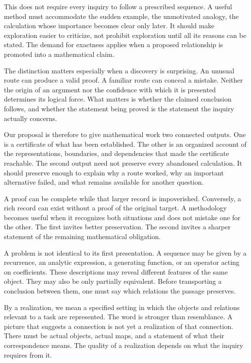 This does not require every inquiry to follow a prescribed sequence. A useful method must accommodate the sudden example, the unmotivated analogy, the calculation whose importance becomes clear only later. It should make exploration easier to criticize, not prohibit exploration until all its reasons can be stated. The demand for exactness applies when a proposed relationship is promoted into a mathematical claim.

The distinction matters especially when a discovery is surprising. An unusual route can produce a valid proof. A familiar route can conceal a mistake. Neither the origin of an argument nor the confidence with which it is presented determines its logical force. What matters is whether the claimed conclusion follows, and whether the statement being proved is the statement the inquiry actually concerns.

Our proposal is therefore to give mathematical work two connected outputs. One is a certificate of what has been established. The other is an organized account of the representations, boundaries, and dependencies that made the certificate reachable. The second output need not preserve every abandoned calculation. It should preserve enough to explain why a route worked, why an important alternative failed, and what remains available for another question.

A proof can be complete while that larger record is impoverished. Conversely, a rich record can exist without a proof of the original target. A methodology becomes useful when it recognizes both situations and does not mistake one for the other. The first invites better preservation. The second invites a sharper statement of the remaining mathematical obligation.


A problem is not identical to its first presentation. A sequence may be given by a recurrence, an analytic expression, a generating function, or an operator acting on coefficients. These descriptions may reveal different features of the same object. They may also be only partially equivalent. Before transporting a conclusion between them, one must say which relations the passage preserves.

By a realization, we mean a specified setting in which the objects and relations relevant to a task are represented. The word is stronger than resemblance. A picture that suggests a connection is not yet a realization of that connection. There must be actual objects, actual maps, and a statement of what their correspondence means. The quality of a realization depends on what the inquiry requires from it.

